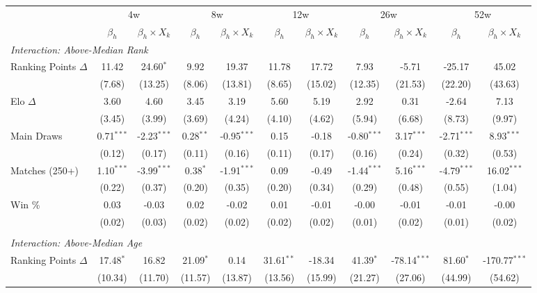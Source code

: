 \begin{tabular}{lcccccccccc}
\toprule
  & \multicolumn{2}{c}{4w} & \multicolumn{2}{c}{8w} & \multicolumn{2}{c}{12w} & \multicolumn{2}{c}{26w} & \multicolumn{2}{c}{52w} \\
\cmidrule(lr){2-3} \cmidrule(lr){4-5} \cmidrule(lr){6-7} \cmidrule(lr){8-9} \cmidrule(lr){10-11} 
  & $\beta_h$ & $\beta_h \times X_k$ & $\beta_h$ & $\beta_h \times X_k$ & $\beta_h$ & $\beta_h \times X_k$ & $\beta_h$ & $\beta_h \times X_k$ & $\beta_h$ & $\beta_h \times X_k$ \\
\midrule
\multicolumn{11}{l}{\textit{Interaction: Above-Median Rank}} \\
\quad Ranking Points $\Delta$ & 11.42 & 24.60$^{*}$ & 9.92 & 19.37 & 11.78 & 17.72 & 7.93 & -5.71 & -25.17 & 45.02 \\
 & (7.68) & (13.25) & (8.06) & (13.81) & (8.65) & (15.02) & (12.35) & (21.53) & (22.20) & (43.63) \\[0.3em]
\quad Elo $\Delta$ & 3.60 & 4.60 & 3.45 & 3.19 & 5.60 & 5.19 & 2.92 & 0.31 & -2.64 & 7.13 \\
 & (3.45) & (3.99) & (3.69) & (4.24) & (4.10) & (4.62) & (5.94) & (6.68) & (8.73) & (9.97) \\[0.3em]
\quad Main Draws & 0.71$^{***}$ & -2.23$^{***}$ & 0.28$^{**}$ & -0.95$^{***}$ & 0.15 & -0.18 & -0.80$^{***}$ & 3.17$^{***}$ & -2.71$^{***}$ & 8.93$^{***}$ \\
 & (0.12) & (0.17) & (0.11) & (0.16) & (0.11) & (0.17) & (0.16) & (0.24) & (0.32) & (0.53) \\[0.3em]
\quad Matches (250+) & 1.10$^{***}$ & -3.99$^{***}$ & 0.38$^{*}$ & -1.91$^{***}$ & 0.09 & -0.49 & -1.44$^{***}$ & 5.16$^{***}$ & -4.79$^{***}$ & 16.02$^{***}$ \\
 & (0.22) & (0.37) & (0.20) & (0.35) & (0.20) & (0.34) & (0.29) & (0.48) & (0.55) & (1.04) \\[0.3em]
\quad Win \% & 0.03 & -0.03 & 0.02 & -0.02 & 0.01 & -0.01 & -0.00 & -0.01 & -0.01 & -0.00 \\
 & (0.02) & (0.03) & (0.02) & (0.02) & (0.02) & (0.02) & (0.01) & (0.02) & (0.01) & (0.02) \\[0.3em]
\\[0.3em]
\multicolumn{11}{l}{\textit{Interaction: Above-Median Age}} \\
\quad Ranking Points $\Delta$ & 17.48$^{*}$ & 16.82 & 21.09$^{*}$ & 0.14 & 31.61$^{**}$ & -18.34 & 41.39$^{*}$ & -78.14$^{***}$ & 81.60$^{*}$ & -170.77$^{***}$ \\
 & (10.34) & (11.70) & (11.57) & (13.87) & (13.56) & (15.99) & (21.27) & (27.06) & (44.99) & (54.62) \\[0.3em]

\end{tabular}
